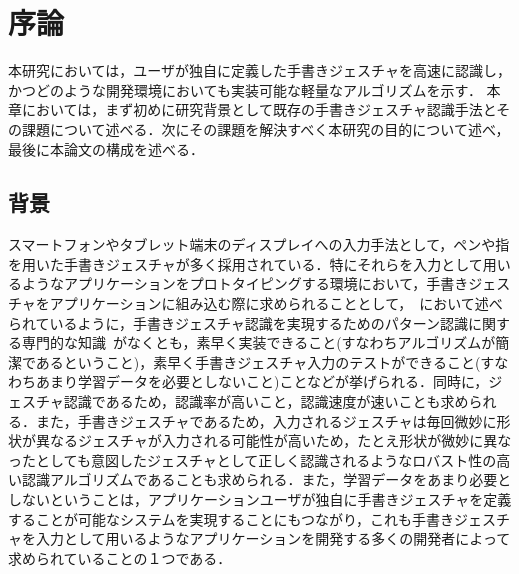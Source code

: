 \chapter{序論}
本研究においては，ユーザが独自に定義した手書きジェスチャを高速に認識し，かつどのような開発環境においても実装可能な軽量なアルゴリズムを示す．
本章においては，まず初めに研究背景として既存の手書きジェスチャ認識手法とその課題について述べる．次にその課題を解決すべく本研究の目的について述べ，最後に本論文の構成を述べる．

\section{背景}
スマートフォンやタブレット端末のディスプレイへの入力手法として，ペンや指を用いた手書きジェスチャが多く採用されている．特にそれらを入力として用いるようなアプリケーションをプロトタイピングする環境において，手書きジェスチャをアプリケーションに組み込む際に求められることとして，~\cite{Rettig:1994:PTF:175276.175288}において述べられているように，手書きジェスチャ認識を実現するためのパターン認識に関する専門的な知識~\cite{Hong00constructingfinite, Anderson2004HiddenMM,Sezgin:2005:HES:1040830.1040899, Cao:2005:EOA:1089508.1089540, Pittman:1991:RHT:108844.108914, Cho:2006:NGR:1711617.1711649,Rubine:1991:SGE:127719.122753, Anthony:2010:LMR:1839214.1839258}がなくとも，素早く実装できること(すなわちアルゴリズムが簡潔であるということ)，素早く手書きジェスチャ入力のテストができること(すなわちあまり学習データを必要としないこと)ことなどが挙げられる．同時に，ジェスチャ認識であるため，認識率が高いこと，認識速度が速いことも求められる．また，手書きジェスチャであるため，入力されるジェスチャは毎回微妙に形状が異なるジェスチャが入力される可能性が高いため，たとえ形状が微妙に異なったとしても意図したジェスチャとして正しく認識されるようなロバスト性の高い認識アルゴリズムであることも求められる．また，学習データをあまり必要としないということは，アプリケーションユーザが独自に手書きジェスチャを定義することが可能なシステムを実現することにもつながり，これも手書きジェスチャを入力として用いるようなアプリケーションを開発する多くの開発者によって求められていることの１つである．

